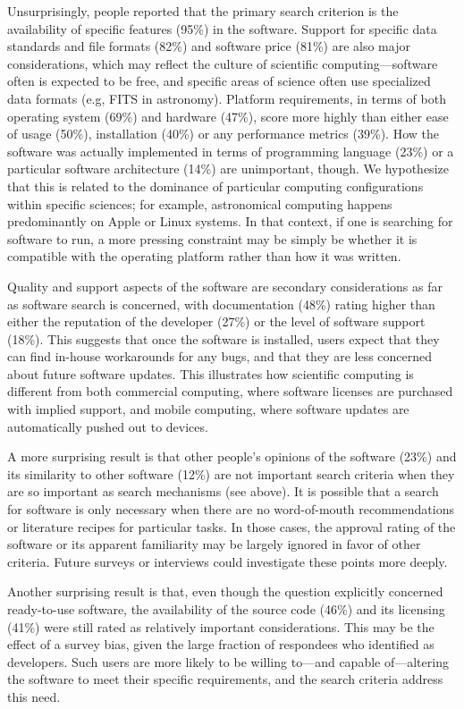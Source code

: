 \documentclass{casicswhitepaper}
\begin{document}
Unsurprisingly, people reported that the primary search criterion is the availability of specific features (95\%) in the software. Support for specific data standards and file formats (82\%) and software price (81\%) are also major considerations, which may reflect the culture of scientific computing---software often is expected to be free, and specific areas of science often use specialized data formats (e.g, FITS in astronomy). Platform requirements, in terms of both operating system (69\%) and hardware (47\%), score more highly than either ease of usage (50\%), installation (40\%) or any performance metrics (39\%). How the software was actually implemented in terms of programming language (23\%) or a particular software architecture (14\%) are unimportant, though.  We hypothesize that this is related to the dominance of particular computing configurations within specific sciences; for example, astronomical computing happens predominantly on Apple or Linux systems.  In that context, if one is searching for software to run, a more pressing constraint may be simply be whether it is compatible with the operating platform rather than how it was written.

Quality and support aspects of the software are secondary considerations as far as software search is concerned, with documentation (48\%) rating higher than either the reputation of the developer (27\%) or the level of software support (18\%).  This suggests that once the software is installed, users expect that they can find in-house workarounds for any bugs, and that they are less concerned about future software updates. This illustrates how scientific computing is different from both commercial computing, where software licenses are purchased with implied support, and mobile computing, where software updates are automatically pushed out to devices.

A more surprising result is that other people's opinions of the software (23\%) and its similarity to other software (12\%) are not important search criteria when they are so important as search mechanisms (see above). It is possible that a search for software is only necessary when there are no word-of-mouth recommendations or literature recipes for particular tasks. In those cases, the approval rating of the software or its apparent familiarity may be largely ignored in favor of other criteria.  Future surveys or interviews could investigate these points more deeply.

Another surprising result is that, even though the question explicitly concerned ready-to-use software, the availability of the source code (46\%) and its licensing (41\%) were still rated as relatively important considerations. This may be the effect of a survey bias, given the large fraction of respondees who identified as developers. Such users are more likely to be willing to---and capable of---altering the software to meet their specific requirements, and the search criteria address this need.
\end{document}
